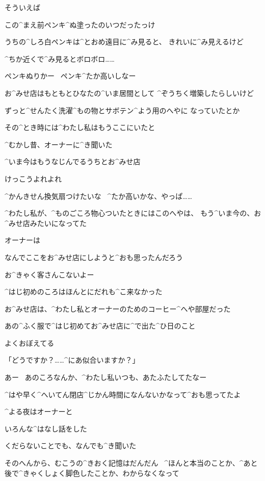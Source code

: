 \page
\A そういえば

\A この^{まえ}{前}ペンキ^{ぬ}{塗}ったのいつだったっけ

\A うちの^{しろ}{白}ペンキは^{とおめ}{遠目}に^{み}{見}ると、
きれいに^{み}{見}えるけど

\A ^{ちか}{近}くで^{み}{見}るとボロボロ……

\A ペンキぬりかー
\ ペンキ^{たか}{高}いしなー

\page
\A お^{みせ}{店}はもともとひなたの^{いま}{居間}として
^{ぞうちく}{増築}したらしいけど

\A ずっと^{せんたく}{洗濯}^{もの}{物}とサボテン^{よう}{用}のへやに
なっていたとか

\A その^{とき}{時}には^{わたし}{私}はもうここにいたと

\A ^{むかし}{昔}、オーナーに^{き}{聞}いた

\page
\A ^{いま}{今}はもうなじんでるうちとお^{みせ}{店}

\A けっこうよれよれ

\A ^{かんきせん}{換気扇}つけたいな
\ ^{たか}{高}いかな、やっぱ……

\page
\A ^{わたし}{私}が、^{ものごころ}{物心}ついたときにはこのへやは、
もう^{いま}{今}の、お^{みせ}{店}みたいになってた

\A オーナーは

\A なんでここをお^{みせ}{店}にしようと^{おも}{思}ったんだろう

\A お^{きゃく}{客}さんこないよー

\page
\A ^{はじ}{初}めのころはほんとにだれも^{こ}{来}なかった

\A お^{みせ}{店}は、^{わたし}{私}とオーナーのためのコーヒー^{へや}{部屋}だった

\page
\A あの^{ふく}{服}で^{はじ}{初}めてお^{みせ}{店}に^{で}{出}た^{ひ}{日}のこと

\A よくおぼえてる

\A 「どうですか？……^{にあ}{似合}いますか？」

\page
\A あー
\ あのころなんか、^{わたし}{私}いつも、あたふたしてたなー

\A ^{はや}{早}く^{へいてん}{閉店}^{じかん}{時間}になんないかなって^{おも}{思}ってたよ

\page
\A ^{よる}{夜}はオーナーと

\A いろんな^{はなし}{話}をした

\A くだらないことでも、なんでも^{き}{聞}いた

\A そのへんから、むこうの^{きおく}{記憶}はだんだん
\ ^{ほんと}{本当}のことか、^{あと}{後}で^{きゃくしょく}{脚色}したことか、わからなくなって


